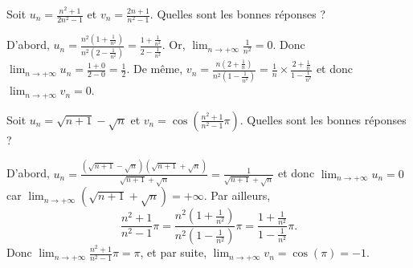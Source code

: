 \begin{question}
Soit $\displaystyle u_n=\frac{n^2+1}{2n^2-1}$ et $\displaystyle v_n=\frac{2n+1}{n^2-1}$. Quelles sont les bonnes réponses ?
\begin{answers}  
\end{answers}
\begin{explanations}
D'abord, $\displaystyle u_n=\frac{n^2\left(1+\frac{1}{n^2}\right)}{n^2\left(2-\frac{1}{n^2}\right)}=\frac{1+\frac{1}{n^2}}{2-\frac{1}{n^2}}$. Or, $\displaystyle \lim _{n\to +\infty}\frac{1}{n^2}=0$. Donc $\displaystyle \lim _{n\to +\infty}u_n=\frac{1+0}{2-0}=\frac{1}{2}$. De même, $\displaystyle v_n=\frac{n\left(2+\frac{1}{n}\right)}{n^2\left(1-\frac{1}{n^2}\right)}=\frac{1}{n}\times\frac{2+\frac{1}{n}}{1-\frac{1}{n^2}}$ et donc $\displaystyle \lim _{n\to +\infty}v_n=0$.
\end{explanations}
\end{question}




\begin{question}
Soit $\displaystyle u_n=\sqrt{n+1}-\sqrt{n}$ et $\displaystyle v_n=\cos\left(\frac{n^2+1}{n^2-1}\pi\right)$. Quelles sont les bonnes réponses ?
\begin{answers}  
\end{answers}
\begin{explanations}
D'abord, $\displaystyle u_n=\frac{\left(\sqrt{n+1}-\sqrt{n}\right)\left(\sqrt{n+1}+\sqrt{n}\right)}{\sqrt{n+1}+\sqrt{n}}=\frac{1}{\sqrt{n+1}+\sqrt{n}}$ et donc $\displaystyle \lim _{n\to +\infty}u_n=0$ car $\displaystyle \lim _{n\to +\infty}\left(\sqrt{n+1}+\sqrt{n}\right)=+\infty$. Par ailleurs,
$$\displaystyle \frac{n^2+1}{n^2-1}\pi=\frac{n^2\left(1+\frac{1}{n^2}\right)}{n^2\left(1-\frac{1}{n^2}\right)}\pi=\frac{1+\frac{1}{n^2}}{1-\frac{1}{n^2}}\pi.$$
Donc $\displaystyle \lim _{n\to +\infty}\frac{n^2+1}{n^2-1}\pi=\pi$, et par suite, $\displaystyle \lim _{n\to +\infty}v_n=\cos (\pi)=-1$.
\end{explanations}
\end{question}





